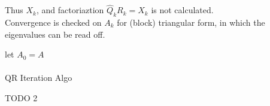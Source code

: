 \documentclass[8pt,letter]{article}
\begin{document}
\begin{multicols*}{2}
    Thus $X_k$, and factoriaztion $\hat{Q}_k R_k = X_k$ is not calculated.\\
    Convergence is checked on $A_k$ for (block) triangular form, in which the eigenvalues can be read off.\\
    
    \begin{algorithm}[H]
      let $A_0 = A$\\
      \\
      \caption{QR Iteration Algo \label{Algo_QR_iteration}}
    \end{algorithm}

    TODO 2
    
\end{multicols*}
\end{document}
